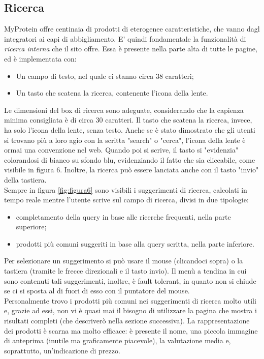 \subsection{Ricerca}
MyProtein offre centinaia di prodotti di eterogenee caratteristiche, che vanno dagl integratori ai capi di abbigliamento. E' quindi fondamentale la funzionalità di \textit{ricerca interna} che il sito offre. Essa è presente nella parte alta di tutte le pagine, ed è implementata con:
\begin{itemize}
    \item Un campo di testo, nel quale ci stanno circa 38 caratteri;
    \item Un tasto che scatena la ricerca, contenente l'icona della lente.
\end{itemize}
Le dimensioni del box di ricerca sono adeguate, considerando che la capienza minima consigliata è di circa 30 caratteri. Il tasto che scatena la ricerca, invece, ha solo l'icona della lente, senza testo. Anche se è stato dimostrato che gli utenti si trovano più a loro agio con la scritta "search" o "cerca", l'icona della lente è ormai una convenzione nel web. Quando poi si scrive, il tasto si "evidenzia" colorandosi di bianco su sfondo blu, evidenziando il fatto che sia cliccabile, come visibile in figura 6. Inoltre, la ricerca può essere lanciata anche con il tasto "invio" della tastiera.\\
Sempre in figura \ref{fig:figura6} sono visibili i suggerimenti di ricerca, calcolati in tempo reale mentre l'utente scrive sul campo di ricerca, divisi in due tipologie:
\begin{itemize}
    \item completamento della query in base alle ricerche frequenti, nella parte superiore;
    \item prodotti più comuni suggeriti in base alla query scritta, nella parte inferiore.
\end{itemize}
Per selezionare un suggerimento si può usare il mouse (clicandoci sopra) o la tastiera (tramite le frecce direzionali e il tasto invio). Il menù a tendina in cui sono contenuti tali suggerimenti, inoltre, è fault tolerant, in quanto non si chiude se ci si sposta al di fuori di esso con il puntatore del mouse. \\
Personalmente trovo i prodotti più comuni nei suggerimenti di ricerca molto utili e, grazie ad essi, non vi è quasi mai il bisogno di utilizzare la pagina che mostra i risultati completi (che descriverò nella sezione successiva). La rappresentazione dei prodotti è scarna ma molto efficace: è presente il nome, una piccola immagine di anteprima (inutile ma graficamente piacevole), la valutazione media e, soprattutto, un'indicazione di prezzo.
